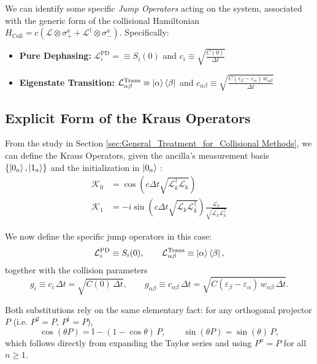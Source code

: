 \documentclass[a4paper,12pt]{article}
\begin{document}
	We can identify some specific \textit{Jump Operators} acting on the system, associated with the generic form of the collisional Hamiltonian $H_{\text{Coll}} = c \left(\mathcal{L} \otimes \sigma_{+}^{a} + \mathcal{L}^{\dagger} \otimes \sigma_{-}^{a}\right)$. Specifically: 
\begin{itemize}
	\item \textbf{Pure Dephasing:} $ \mathcal{L}_{i}^{\text{PD}} =\equiv S_{i}(0) $ and $ c_{i} \equiv \sqrt{\frac{C(0)}{\Delta t}} $
	\item \textbf{Eigenstate Transition:} $ \mathcal{L}_{\alpha\beta}^{\text{Trans}} \equiv \Ket{\alpha}\Bra{\beta} $ and $ c_{\alpha\beta} \equiv \sqrt{\frac{C(\varepsilon_{\beta}-\varepsilon_{\alpha})\, w_{\alpha\beta}}{\Delta t}} $
\end{itemize}

\subsection{Explicit Form of the Kraus Operators}

From the study in Section \ref{sec:General_Treatment_for_Collisional Methods}, we can define the Kraus Operators, given the ancilla's measurement basis $ \{ \ket{0_{a}}, \ket{1_{a}} \} $ and the initialization in $ \ket{0_{a}} $ : 
\begin{align}
	\mathcal{K}_{0} &= \cos{\left(c \Delta t \sqrt{\mathcal{L}_{k}^{\dagger} \mathcal{L}_{k} } \right)} \\
	\mathcal{K}_{1} &= -i \sin{\left( c \Delta t \sqrt{\mathcal{L}_{k} \mathcal{L}_{k}^{\dagger}} \right)} \frac{\mathcal{L}_{k}}{\sqrt{\mathcal{L}_{k} \mathcal{L}_{k}^{\dagger}}}
\end{align}

We now define the specific jump operators in this case:
\begin{equation}
	\mathcal{L}_{i}^{\text{PD}} \equiv S_{i}(0), \qquad \mathcal{L}_{\alpha\beta}^{\text{Trans}} \equiv \Ket{\alpha}\Bra{\beta},
\end{equation}
together with the collision parameters
\begin{equation}
	g_{i} \equiv c_{i}\,\Delta t = \sqrt{C(0)\,\Delta t}, \qquad g_{\alpha\beta} \equiv c_{\alpha\beta}\,\Delta t = \sqrt{C(\varepsilon_{\beta}-\varepsilon_{\alpha})\, w_{\alpha\beta}\, \Delta t}.
\end{equation}

Both substitutions rely on the same elementary fact: for any orthogonal projector $P$ (i.e. $P^{2}=P$, $P^{\dagger}=P$), 
\begin{equation}
	\cos(\theta P) = \mathbb{I} - (1-\cos\theta)\,P, \qquad \sin(\theta P) = \sin(\theta)\, P,
	\label{eq:projector_function_identity}
\end{equation}
which follows directly from expanding the Taylor series and using $P^{n}=P$ for all $n\geq1$.
\end{document}

